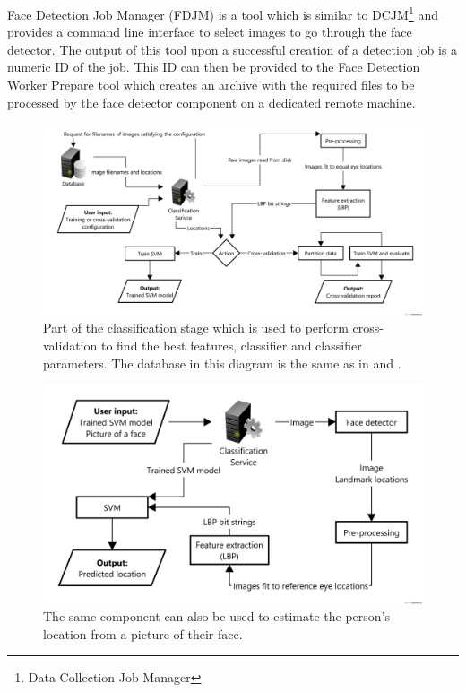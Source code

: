 Face Detection Job Manager (FDJM) is a tool which is similar to
DCJM\footnote{Data Collection Job Manager} and provides a command line
interface to select images to go through the face detector. The output of this
tool upon a successful creation of a detection job is a numeric ID of the job.
This ID can then be provided to the Face Detection Worker Prepare tool which
creates an archive with the required files to be processed by the face detector
component on a dedicated remote machine.

\begin{figure}
\begin{center}
    \includegraphics[width=\textwidth]{figures/spec/diagram_classification_cvtrain}
\end{center}
\caption{Part of the classification stage which is used to perform
cross-validation to find the best features, classifier and classifier
parameters. The database in this diagram is the same as in
 and .}
\label{fig:spec:diagram_cvtrain}
\end{figure}

\begin{figure}
\begin{center}
    \includegraphics[width=\textwidth]{figures/spec/diagram_classification_classify}
\end{center}
\caption{The same component can also be used to estimate the person's location
from a picture of their face.}
\label{fig:spec:diagram_classify}
\end{figure}

